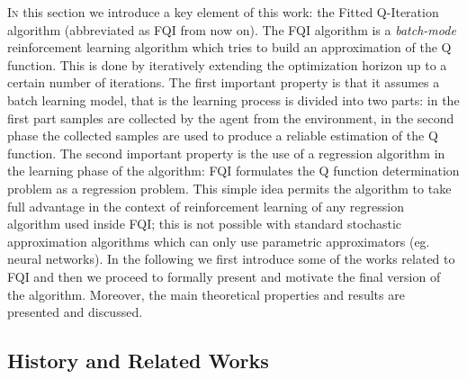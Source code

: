 	\lettrine[lines=2]{I}n this section we introduce a key element of this work: the Fitted Q-Iteration algorithm (abbreviated as FQI from now on).\newline
	The FQI algorithm is a \textit{batch-mode} reinforcement learning algorithm which tries to build an approximation of the Q function.
	This is done by iteratively extending the optimization horizon up to a certain number of iterations.\newline
	The first important property is that it assumes a batch learning model, that is the learning process is divided into two parts:
	in the first part samples are collected by the agent from the environment, in the second phase the collected samples
	are used to produce a reliable estimation of the Q function.\newline
	The second important property is the use of a regression algorithm in the learning phase of the algorithm: FQI formulates
	the Q function determination problem as a regression problem. This simple idea permits the algorithm to take full advantage
	in the context of reinforcement learning of any regression algorithm used inside FQI; this is not possible with standard stochastic
	approximation algorithms which can only use parametric approximators (eg. neural networks).\newline
	In the following we first introduce some of the works related to FQI and then we proceed to formally present and motivate
	the final version of the algorithm. Moreover, the main theoretical properties and results are presented and discussed.


	\subsection{History and Related Works}

